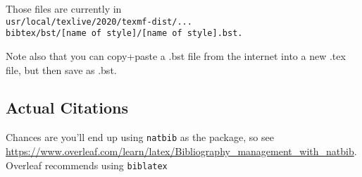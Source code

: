 Those files are currently in\\
\verb+usr/local/texlive/2020/texmf-dist/...+\\
\verb+bibtex/bst/[name of style]/[name of style].bst.+

Note also that you can copy+paste a .bst file from the internet into a new .tex file, but then save as .bst.

\subsection{Actual Citations}
Chances are you'll end up using \verb+natbib+ as the package, so see \url{https://www.overleaf.com/learn/latex/Bibliography_management_with_natbib}. Overleaf recommends using \verb+biblatex+ 